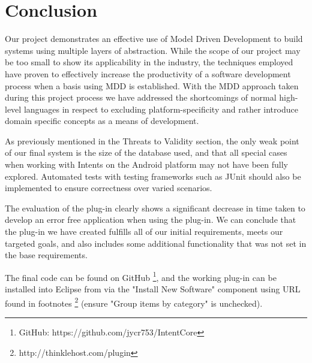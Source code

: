 \section{Conclusion}
\label{conclusion}

Our project demonstrates an effective use of Model Driven Development to build systems using multiple layers of abstraction. While the scope of our project may be too small to show its applicability in the industry, the techniques employed have proven to effectively increase the productivity of a software development process when a basis using MDD is established.
With the MDD approach taken during this project process we have addressed the shortcomings of normal high-level languages in respect to excluding platform-specificity and rather introduce domain specific concepts as a means of development. 

As previously mentioned in the Threats to Validity section, the only weak point of our final system is the size of the database used, and that all special cases when working with Intents on the Android platform may not have been fully explored. Automated tests with testing frameworks such as JUnit should also be implemented to ensure correctness over varied scenarios.

The evaluation of the plug-in clearly shows a significant decrease in time taken to develop an error free application when using the plug-in. We can conclude that the plug-in we have created fulfills all of our initial requirements, meets our targeted goals, and also includes some additional functionality that was not set in the base requirements.

The final code can be found on GitHub \footnote{GitHub: https://github.com/jycr753/IntentCore}, and the working plug-in can be installed into Eclipse from via the "Install New Software" component using URL found in footnotes \footnote{http://thinklehost.com/plugin} (ensure "Group items by category" is unchecked).


